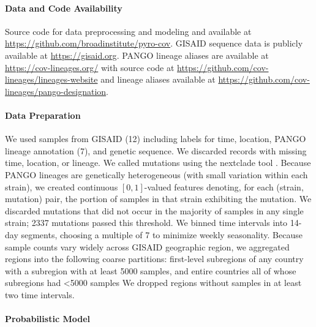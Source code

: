 \documentclass[12pt]{article}
\begin{document}
\paragraph*{Data and Code Availability}

Source code for data preprocessing and modeling and available at
\url{https://github.com/broadinstitute/pyro-cov}.
GISAID sequence data is publicly available at
\url{https://gisaid.org}.
PANGO lineage aliases are available at \url{https://cov-lineages.org/} with source code at \url{https://github.com/cov-lineages/lineages-website} and lineage aliases available at \url{https://github.com/cov-lineages/pango-designation}.

\paragraph*{Data Preparation}

We used samples from GISAID (12) including labels for time, location, PANGO lineage annotation (7), and genetic sequence.
We discarded records with missing time, location, or lineage.
We called mutations using the nextclade tool \cite{aksamentov2020nextclade}.
Because PANGO lineages are genetically heterogeneous (with small variation within each strain), we created continuous $[0, 1]$-valued features denoting, for each (strain, mutation) pair, the portion of samples in that strain exhibiting the mutation.
We discarded mutations that did not occur in the majority of samples in any single strain; 2337 mutations passed this threshold.
We binned time intervals into 14-day segments, choosing a multiple of 7 to minimize weekly seasonality.
Because sample counts vary widely across GISAID geographic region, we aggregated regions into the following coarse partitions: first-level subregions of any country with a subregion with at least 5000 samples, and entire countries all of whose subregions had <5000 samples
We dropped regions without samples in at least two time intervals.

\paragraph*{Probabilistic Model}

% 
\end{document}
